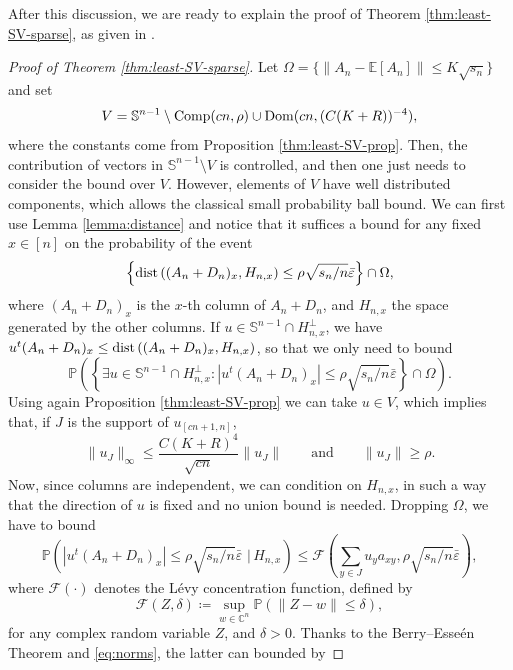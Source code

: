 \documentclass[11pt,oneside]{amsart}
\theoremstyle{plain}
\numberwithin{equation}{section}
\newcommand{\eps}{\varepsilon}
\newcommand{\E}{\mathbb{E}}
\newcommand{\p}{\mathbb{P}}
\newcommand{\scaling}{s_n}
\begin{document}
After this discussion, we are ready to explain the proof of Theorem \ref{thm:least-SV-sparse}, as given in \cite{BasakRudelson19}.

\begin{proof}[Proof of Theorem \ref{thm:least-SV-sparse}]
Let $\Omega = \{\|A_n-\E[A_n]\|\le K\sqrt{\scaling}\}$ and set
\[
V= \mathbb{S}^{n-1}\setminus {\rm Comp}(cn,\rho) \cup {\rm Dom}(cn,(C(K+R))^{-4}),
\]
where the constants come from Proposition \ref{thm:least-SV-prop}. Then, the contribution of vectors in $\mathbb{S}^{n-1}\setminus V$ is controlled, and then one just needs to consider the bound over $V$. However, elements of $V$ have well distributed components, which allows the classical small probability ball bound. We can first use Lemma \ref{lemma:distance} and notice that it suffices a bound for any fixed $x \in [n]$ on the probability of the event 
\begin{equation}
    \left\{ {\rm dist} \left((A_n+D_n)_{x},H_{n,x}\right)\le \rho\sqrt{{\scaling}/{n}} \bar \eps\right\} \cap \Omega,
\end{equation}
where $(A_n+D_n)_{x}$ is the $x$-th column of $A_n+D_n$, and $H_{n,x}$ the space generated by the other columns.
If $u \in \mathbb{S}^{n-1}\cap H_{n,x}^\perp$, we have $u^t (A_n+D_n)_{x}\le {\rm dist} \left((A_n+D_n)_{x},H_{n,x}\right)$, so that we only need to bound
\begin{equation}
\p\left( \left\{\exists u \in \mathbb{S}^{n-1} \cap H_{n,x}^\perp : 
\left|u^t (A_n+D_n)_{x}\right|
\le\rho\sqrt{{\scaling}/{n}} \bar \eps \right\} \cap \Omega \right).
\end{equation}
Using again Proposition \ref{thm:least-SV-prop} we can take $u \in  V$, which implies that, if $J$ is the support of $u_{[cn+1,n]}$,
\begin{equation} \label{eq:norms}
    \|u_J\|_{\infty} \le \frac{C(K+R)^4}{\sqrt{cn}}\|u_J\| \qquad \text{and} \qquad \|u_J\|\ge \rho.
\end{equation}
Now, since columns are independent, we can condition on $H_{n,x}$, in such a way that the direction of $u$ is fixed and no union bound is needed. Dropping $\Omega$, we have to bound
$$\p\left( \left|u^t (A_n+D_n)_{x}\right|\le\rho\sqrt{{\scaling}/{n}} \bar \eps 
\,\, \Big| \,H_{n,x} \right) \le 
\mathcal{F}\left(\sum_{y \in J} u_y a_{xy},\rho\sqrt{{\scaling}/{n}} \bar \eps\right),$$
where $\mathcal{F}(\cdot)$ denotes the Lévy concentration function, defined by 
\begin{equation}
    \mathcal{F}(Z,\delta) \coloneq \sup_{w \in \mathbb{C}^n} \p\left( \|Z-w\| \le \delta \right),
\end{equation}
for any complex random variable $Z$, and $\delta >0$.
Thanks to the Berry--Esseén Theorem \cite[Theorem 2.2.17]{Stroock} 
and \eqref{eq:norms}, the latter can bounded by


\end{proof}
\end{document}
